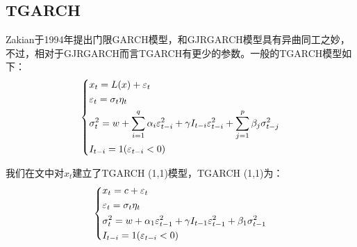     \subsection{TGARCH}
        Zakian于1994年提出门限GARCH模型，和GJRGARCH模型具有异曲同工之妙，不过，相对于GJRGARCH而言TGARCH有更少的参数。一般的TGARCH模型如下：
        \begin{equation*}
        \centering
        \left\{\begin{lgathered}
        {x_t} = L(x) + {\varepsilon _t}\\
        {\varepsilon _t} = {\sigma _t}{\eta _t}\\
        \sigma _t^2 = w + \sum\limits_{i = 1}^q {{\alpha _i}\varepsilon _{t - i}^2}  + \gamma {I_{t - i}}\varepsilon _{t - i}^2 + \sum\limits_{j = 1}^p {{\beta _j}\sigma _{t - j}^2} \\
        {I_{t - i}} = 1({\varepsilon _{t - i}} < 0)
        \end{lgathered} \right.
         \end{equation*}
         \par
        我们在文中对$x_t$建立了TGARCH (1,1)模型，TGARCH (1,1)为：
        \begin{equation*}
        \centering
        \left\{\begin{lgathered}
        {x_t} = c + {\varepsilon _t}\\
        {\varepsilon _t} = {\sigma _t}{\eta _t}\\
        \sigma _t^2 = w + {\alpha _1}\varepsilon _{t - 1}^2 + \gamma {I_{t - 1}}\varepsilon _{t - 1}^2 + {\beta _1}\sigma _{t - 1}^2\\
        {I_{t - i}} = 1({\varepsilon _{t - i}} < 0)
         \end{lgathered} \right.
         \end{equation*}
